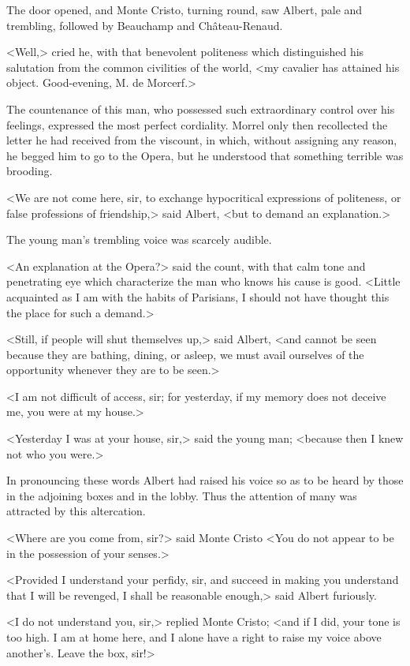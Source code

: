  The door opened, and Monte Cristo, turning round, saw Albert, pale and trembling, followed by Beauchamp and Château-Renaud. 

 <Well,> cried he, with that benevolent politeness which distinguished his salutation from the common civilities of the world, <my cavalier has attained his object. Good-evening, M. de Morcerf.> 

 The countenance of this man, who possessed such extraordinary control over his feelings, expressed the most perfect cordiality. Morrel only then recollected the letter he had received from the viscount, in which, without assigning any reason, he begged him to go to the Opera, but he understood that something terrible was brooding. 

 <We are not come here, sir, to exchange hypocritical expressions of politeness, or false professions of friendship,> said Albert, <but to demand an explanation.> 

 The young man's trembling voice was scarcely audible. 

 <An explanation at the Opera?> said the count, with that calm tone and penetrating eye which characterize the man who knows his cause is good. <Little acquainted as I am with the habits of Parisians, I should not have thought this the place for such a demand.> 

 <Still, if people will shut themselves up,> said Albert, <and cannot be seen because they are bathing, dining, or asleep, we must avail ourselves of the opportunity whenever they are to be seen.> 

 <I am not difficult of access, sir; for yesterday, if my memory does not deceive me, you were at my house.> 

 <Yesterday I was at your house, sir,> said the young man; <because then I knew not who you were.> 

 In pronouncing these words Albert had raised his voice so as to be heard by those in the adjoining boxes and in the lobby. Thus the attention of many was attracted by this altercation. 

<Where are you come from, sir?> said Monte Cristo <You do not appear to be in the possession of your senses.> 

 <Provided I understand your perfidy, sir, and succeed in making you understand that I will be revenged, I shall be reasonable enough,> said Albert furiously. 

 <I do not understand you, sir,> replied Monte Cristo; <and if I did, your tone is too high. I am at home here, and I alone have a right to raise my voice above another's. Leave the box, sir!> 

